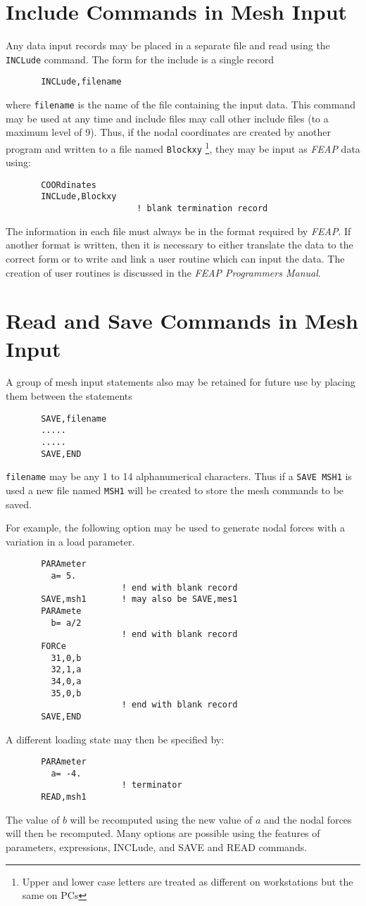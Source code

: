 \section{Include Commands in Mesh Input}

Any data input records may be placed in a separate file and read using
the {\tt INCLude} command.  The form for the include is a single record
\begin{verbatim}
       INCLude,filename
\end{verbatim}
where {\tt filename} is the name of the file containing the input data.
This command may be used at any time and include files may call other
include files (to a maximum level of 9).  Thus, if the nodal coordinates
are created by another program and written to a file named {\tt Blockxy}
{\footnote{Upper and lower case letters are treated as different on 
workstations but the same on PCs}},
they may be input as {\sl FEAP} data using:
\begin{verbatim}
       COORdinates
       INCLude,Blockxy
                          ! blank termination record
\end{verbatim}
The information in each file must always be in the format required by
{\sl FEAP}.
If another format is written, then it is necessary to either translate the
data to the correct form or to write and link a user routine which can
input the data.
The creation of user routines is discussed in the {\sl FEAP Programmers Manual}.

\section{Read and Save Commands in Mesh Input}

A group of mesh input statements also may be retained for future use by
placing them between the statements
\begin{verbatim}
       SAVE,filename
       .....
       .....
       SAVE,END
\end{verbatim}
{\tt filename} may be any 1 to 14 alphanumerical characters. Thus if
a {\tt SAVE MSH1} is used a new file named {\tt MSH1} will be
created to store the mesh commands to be saved.

For example, the following option may be used to generate nodal
forces with a variation in a load parameter.
\begin{verbatim}
       PARAmeter
         a= 5.
                       ! end with blank record
       SAVE,msh1       ! may also be SAVE,mes1
       PARAmete
         b= a/2
                       ! end with blank record
       FORCe
         31,0,b
         32,1,a
         34,0,a
         35,0,b
                       ! end with blank record
       SAVE,END
\end{verbatim}
A different loading state may then be specified by:
\begin{verbatim}
       PARAmeter
         a= -4.
                       ! terminator
       READ,msh1
\end{verbatim}
The value of $b$ will be recomputed using the new value of $a$
and the nodal forces will then be recomputed.  Many options are
possible using the features of parameters, expressions, INCLude, and SAVE
and READ commands.
